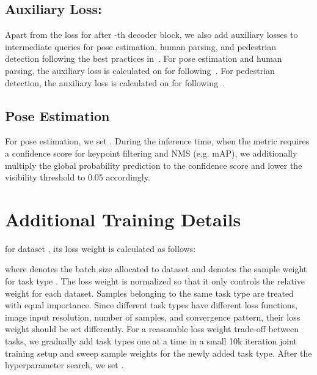 \documentclass[10pt,twocolumn,letterpaper]{article}
\begin{document}
\subsection{Auxiliary Loss:}
Apart from the loss for  after -th decoder block, we also add auxiliary losses to intermediate queries for pose estimation, human parsing, and pedestrian detection following the best practices in~\cite{cheng2022masked,zheng2022progressive,carion2020end}. For pose estimation and human parsing, the auxiliary loss is calculated on  for  following~\cite{cheng2022masked}. For pedestrian detection, the auxiliary loss is calculated on  for  following~\cite{zheng2022progressive,carion2020end}.



\subsection{Pose Estimation}
For pose estimation, we set . During the inference time, when the metric requires a confidence score for keypoint filtering and NMS (e.g. mAP), we additionally multiply the global probability  prediction  to the confidence score and lower the visibility threshold to 0.05 accordingly.


\section{Additional Training Details}
 for dataset , its loss weight  is calculated as follows:

where  denotes the batch size allocated to dataset  and  denotes the sample weight for task type . The loss weight is normalized so that it only controls the relative weight for each dataset. Samples belonging to the same task type are treated with equal importance. Since different task types have different loss functions, image input resolution, number of samples, and convergence pattern, their loss weight should be set differently. For a reasonable loss weight trade-off between tasks, we gradually add task types one at a time in a small 10k iteration joint training setup and sweep sample weights for the newly added task type. After the hyperparameter search, we set .
\end{document}
